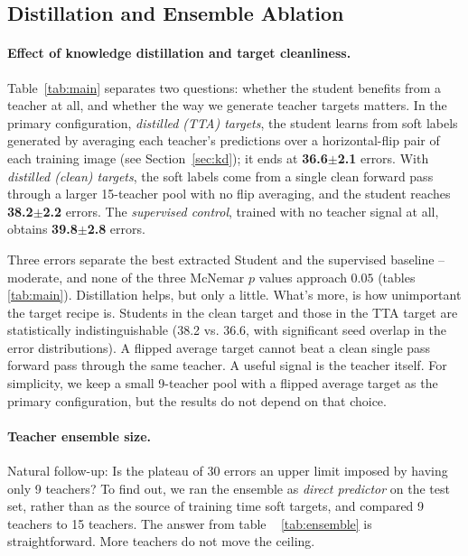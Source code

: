 \subsection{Distillation and Ensemble Ablation}
\label{sec:ablation-kd}

\paragraph{Effect of knowledge distillation and target cleanliness.}
Table~\ref{tab:main} separates two questions: whether the student benefits
from a teacher at all, and whether the way we generate teacher targets matters.
In the primary configuration, \emph{distilled (TTA) targets}, the student learns
from soft labels generated by averaging each teacher's predictions over a
horizontal-flip pair of each training image (see Section~\ref{sec:kd}); it
ends at \textbf{36.6$\pm$2.1} errors.  With \emph{distilled (clean) targets},
the soft labels come from a single clean forward pass through a larger
15-teacher pool with no flip averaging, and the student reaches
\textbf{38.2$\pm$2.2} errors.  The \emph{supervised control}, trained with no
teacher signal at all, obtains \textbf{39.8$\pm$2.8} errors.

Three errors separate the best extracted Student and the supervised baseline -- moderate, and none of the three McNemar $p$ values approach $0.05$ (tables ~ \ref{tab:main}). Distillation helps, but only a little. What's more, is how unimportant the target recipe is. Students in the clean target and those in the TTA target are statistically indistinguishable (38.2 vs. 36.6, with significant seed overlap in the error distributions). A flipped average target cannot beat a clean single pass forward pass through the same teacher. A useful signal is the teacher itself. For simplicity, we keep a small 9-teacher pool with a flipped average target as the primary configuration, but the results do not depend on that choice.

\paragraph{Teacher ensemble size.} Natural follow-up: Is the plateau of 30 errors an upper limit imposed by having only 9 teachers? To find out, we ran the ensemble as \emph{direct predictor} on the test set, rather than as the source of training time soft targets, and compared 9 teachers to 15 teachers. The answer from table ~ \ref{tab:ensemble} is straightforward. More teachers do not move the ceiling.

